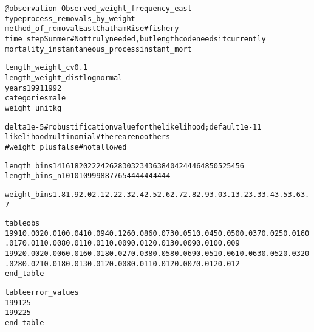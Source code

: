 \documentclass[a4paper,11pt,twoside,pdftex,draft]{article}
\begin{document}
\begin{alltt}
\texttt{@observation Observed\_weight\_frequency\_east}
type process\_removals\_by\_weight
method\_of\_removal EastChathamRise  # fishery
time\_step Summer # Not truly needed, but length code needs it currently
mortality\_instantaneous\_process instant\_mort


length\_weight\_cv 0.1
length\_weight\_dist lognormal
years 1991 1992
categories male
weight\_unit kg

delta 1e-5  # robustification value for the likelihood; default 1e-11
likelihood multinomial	#there are no others
#weight\_plus false        #not allowed

length\_bins 14 16 18 20 22 24 26 28 30 32 34 36 38 40 42 44 46 48 50 52 54 56
length\_bins\_n 10 10 10 9 9 9 8 8 7 7 6 5 4 4 4 4 4 4 4 4 4 4

weight\_bins 1.8 1.9 2.0 2.1 2.2 2.3 2.4 2.5 2.6 2.7 2.8 2.9 3.0 3.1 3.2 3.3 3.4 3.5 3.6 3.7 % 3.8 3.9 4.0 4.1 4.2 4.3 4.4 4.5 4.6 4.7 4.8 4.9 5.0 5.1 5.2 5.3 5.4 5.5 5.6 5.7 5.8 5.9 6.0 6.1 6.2 6.3 6.4 6.5 6.6 6.7 6.8 6.9 7.0 7.1 7.2 7.3 7.4 7.5 7.6 7.7 7.8 7.9 8.0 8.1 8.2 8.3 8.4 8.5 8.6 8.7 8.8 8.9 9.0 9.1 9.2 9.3 9.4 9.5 9.6 9.7 9.8 9.9 10.0 10.1 10.2 10.3 10.4 10.5 10.6 10.7 10.8 10.9 11.0 11.1 11.2 11.3 11.4 11.5 11.6 11.7 11.8

table obs
1991 0.002 0.010 0.041 0.094 0.126 0.086 0.073 0.051 0.045 0.050 0.037 0.025 0.016 0.017 0.011 0.008 0.011 0.011 0.009 0.012 0.013 0.009 0.010 0.009 % 0.0100.0070.0080.0060.0050.0100.0080.0140.0080.0120.0060.0070.0090.0050.0070.0060.0040.0060.0040.0040.0070.0050.0020.0060.0040.0030.0040.0020.0040.0030.0020.0020.0020.0010.0020.0030.0010.0020.0010.0010.0010.0010.0010.0010.0010.0000.0010.0010.0000.0010.0010.0010.0010.0000.0010.0010.0010.0010.0010.0010.0000.0010.0000.0010.0000.0000.0010.0000.0000.0000.0000.0000.0000.0000.0000.001
1992 0.002 0.006 0.016 0.018 0.027 0.038 0.058 0.069 0.051 0.061 0.063 0.052 0.032 0.028 0.021 0.018 0.013 0.012 0.008 0.011 0.012 0.007 0.012 0.012 % 0.0150.0070.0090.0110.0090.0100.0140.0130.0120.0190.0110.0130.0130.0090.0100.0140.0080.0090.0060.0060.0080.0080.0050.0080.0070.0060.0030.0060.0060.0040.0020.0040.0070.0030.0040.0030.0020.0030.0020.0020.0020.0020.0020.0020.0020.0020.0020.0010.0010.0010.0020.0020.0010.0020.0020.0020.0010.0010.0010.0020.0010.0010.0010.0010.0010.0000.0010.0010.0000.0010.0010.0000.0000.0010.0000.001
end\_table

table error\_values
1991 25
1992 25
end\_table
\end{alltt}
\end{document}
